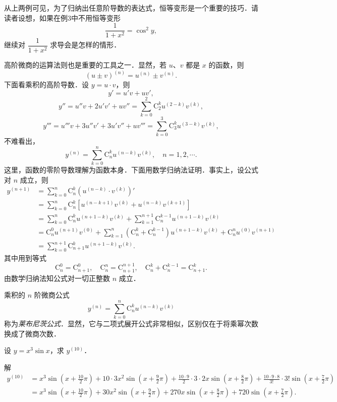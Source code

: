 从上两例可见，为了归纳出任意阶导数的表达式，恒等变形是一个重要的技巧．请读者设想，如果在例3中不用恒等变形
\[
\frac{1}{1+x^{2}}=\cos^{2}y,
\]
继续对 $\dfrac{1}{1+x^{2}}$ 求导会是怎样的情形．

高阶微商的运算法则也是重要的工具之一．显然，若 $u$、$v$ 都是 $x$ 的函数，则
\[
(u\pm v)^{(n)}=u^{(n)}\pm v^{(n)}.
\]
下面看乘积的高阶导数．设 $y=u\cdot v$，则
\[
y'=u'v+uv',
\]
\[
y''=u''v+2u'v'+uv''=\sum_{k=0}^{2}\mathrm{C}_{2}^{k}u^{(2-k)}v^{(k)},
\]
\[
y'''=u'''v+3u''v'+3u'v''+uv'''=\sum_{k=0}^{3}\mathrm{C}_{3}^{k}u^{(3-k)}v^{(k)},
\]
不难看出，
\[
y^{(n)}=\sum_{k=0}^{n}\mathrm{C}_{n}^{k}u^{(n-k)}v^{(k)},\quad n=1,2,\cdots.
\]
这里，函数的零阶导数理解为函数本身．下面用数学归纳法证明．事实上，设公式对 $n$ 成立，则
\[
\begin{aligned}
y^{(n+1)}&=\sum_{k=0}^{n}\mathrm{C}_{n}^{k}\left(u^{(n-k)}\cdot v^{(k)}\right)'\\
&=\sum_{k=0}^{n}\mathrm{C}_{n}^{k}\left[u^{(n-k+1)}v^{(k)}+u^{(n-k)}v^{(k+1)}\right]\\
&=\sum_{k=0}^{n}\mathrm{C}_{n}^{k}u^{(n+1-k)}v^{(k)}+\sum_{k=1}^{n+1}\mathrm{C}_{n}^{k-1}u^{(n+1-k)}v^{(k)}\\
&=\mathrm{C}_{n}^{0}u^{(n+1)}v^{(0)}+\sum_{k=1}^{n}\left(\mathrm{C}_{n}^{k}+\mathrm{C}_{n}^{k-1}\right)u^{(n+1-k)}v^{(k)}+\mathrm{C}_{n}^{n}u^{(0)}v^{(n+1)}\\
&=\sum_{k=0}^{n+1}\mathrm{C}_{n+1}^{k}u^{(n+1-k)}v^{(k)}.
\end{aligned}
\]
其中用到等式
\[
\mathrm{C}_{n}^{0}=\mathrm{C}_{n+1}^{0},\quad\mathrm{C}_{n}^{n}=\mathrm{C}_{n+1}^{n+1},\quad\mathrm{C}_{n}^{k}+\mathrm{C}_{n}^{k-1}=\mathrm{C}_{n+1}^{k}.
\]
由数学归纳法知公式对一切正整数 $n$ 成立．

乘积的 $n$ 阶微商公式
\[
y^{(n)}=\sum_{k=0}^{n}\mathrm{C}_{n}^{k}u^{(n-k)}v^{(k)}
\]
称为\emph{莱布尼茨公式}．显然，它与二项式展开公式非常相似，区别仅在于将乘幂次数换成了微商次数．

\begin{example}\label{ex:4-4-4}
设 $y=x^{3}\sin x$，求 $y^{(10)}$．

解
\[
\begin{aligned}
y^{(10)}&=x^{3}\sin\left(x+\frac{10}{2}\pi\right)+10\cdot 3x^{2}\sin\left(x+\frac{9}{2}\pi\right)+\frac{10\cdot 9}{2}\cdot 3\cdot 2x\sin\left(x+\frac{8}{2}\pi\right)+\frac{10\cdot 9\cdot 8}{3!}\cdot 3!\sin\left(x+\frac{7}{2}\pi\right)\\
&=x^{3}\sin\left(x+\frac{10}{2}\pi\right)+30x^{2}\sin\left(x+\frac{9}{2}\pi\right)+270x\sin\left(x+\frac{8}{2}\pi\right)+720\sin\left(x+\frac{7}{2}\pi\right).
\end{aligned}
\]
\end{example}

